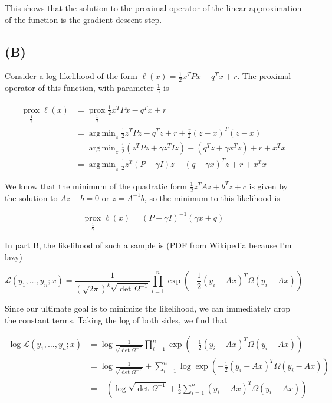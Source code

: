 \documentclass{article}
\DeclareMathOperator*{\argmin}{arg\,min}
\newcommand{\prox}{ \mathop{\mathrm{prox}} }
\newcommand{\calL}{{\mathcal{L}}}
\begin{document}
This shows that the solution to the proximal operator of the linear
approximation of the function is the gradient descent step.

\subsection*{(B)}

Consider a log-likelihood of the form $\ell(x) = \frac{1}{2} x^TPx - q^Tx + r$.
The proximal operator of this function, with parameter $\frac{1}{\gamma}$ is

\begin{align*}
  \prox\limits_{\frac{1}{\gamma}} \ell(x)
  &= \prox\limits_{\frac{1}{\gamma}} \frac{1}{2} x^TPx - q^Tx + r\\
  &= \argmin_z \frac{1}{2} z^TPz - q^Tz + r + \frac{\gamma}{2} (z - x)^T(z - x)\\
  &= \argmin_z \frac{1}{2} \left( z^TPz + \gamma z^T I z \right)
    - (q^Tz + \gamma x^Tz)  + r + x^Tx \\
  &= \argmin_z \frac{1}{2} z^T(P + \gamma I)z - (q + \gamma x)^T z + r + x^Tx
\end{align*}

We know that the minimum of the quadratic form $\frac{1}{2} z^TAz + b^Tz + c$ is
given by the solution to $Az - b = 0$ or $z = A^{-1}b$, so the minimum to this
likelihood is

\[
  \prox\limits_{\frac{1}{\gamma}} \ell(x) = \left( P + \gamma I \right)^{-1} (\gamma
  x + q)
\]


In part B, the likelihood of such a sample is (PDF from Wikipedia because I'm lazy)

\[
  \calL (y_1, \dots, y_n ; x) = \frac{1}{\left( \sqrt{2\pi}\right)^k
    \sqrt{\det{\Omega^{-1}}}} \prod_{i=1}^n \exp \left( -\frac{1}{2}(y_i - Ax)^T
  \Omega(y_i - Ax)\right)
\]

Since our ultimate goal is to minimize the likelihood, we can immediately drop
the constant terms. Taking the log of both sides, we find that

\begin{align*}
  \log \calL (y_1, \dots, y_n ; x)
  &= \log \frac{1}{\sqrt{\det{\Omega^{-1}}}} \prod_{i=1}^n \exp \left( -\frac{1}{2}(y_i - Ax)^T
    \Omega(y_i - Ax)\right)\\
  &= \log \frac{1}{\sqrt{\det{\Omega^{-1}}}} + \sum_{i=1}^n \log \exp \left( -\frac{1}{2}(y_i - Ax)^T
    \Omega(y_i - Ax)\right)\\
  &=-\left( \log \sqrt{\det{\Omega^{-1}}} + \frac{1}{2} \sum_{i=1}^n(y_i - Ax)^T
    \Omega(y_i - Ax)\right) 
\end{align*}
\end{document}
